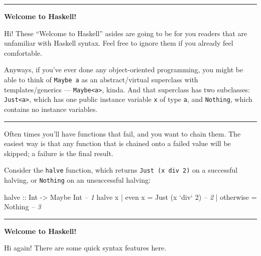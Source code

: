 \documentclass[]{article}
\newenvironment{Shaded}{}{}
\newcommand{\DataTypeTok}[1]{\textcolor[rgb]{0.56,0.13,0.00}{#1}}
\newcommand{\DecValTok}[1]{\textcolor[rgb]{0.25,0.63,0.44}{#1}}
\newcommand{\CommentTok}[1]{\textcolor[rgb]{0.38,0.63,0.69}{\textit{#1}}}
\newcommand{\OtherTok}[1]{\textcolor[rgb]{0.00,0.44,0.13}{#1}}
\newcommand{\FunctionTok}[1]{\textcolor[rgb]{0.02,0.16,0.49}{#1}}
\newcommand{\NormalTok}[1]{#1}
\begin{document}
\begin{center}\rule{0.5\linewidth}{\linethickness}\end{center}

\textbf{Welcome to Haskell!}

Hi! These ``Welcome to Haskell'' asides are going to be for you readers that are
unfamiliar with Haskell syntax. Feel free to ignore them if you already feel
comfortable.

Anyways, if you've ever done any object-oriented programming, you might be able
to think of \texttt{Maybe\ a} as an abstract/virtual superclass with
templates/generics --- \texttt{Maybe\textless{}a\textgreater{}}, kinda. And that
superclass has two subclasses: \texttt{Just\textless{}a\textgreater{}}, which
has one public instance variable \texttt{x} of type \texttt{a}, and
\texttt{Nothing}, which contains no instance variables.

\begin{center}\rule{0.5\linewidth}{\linethickness}\end{center}

Often times you'll have functions that fail, and you want to chain them. The
easiest way is that any function that is chained onto a failed value will be
skipped; a failure is the final result.

Consider the \texttt{halve} function, which returns
\texttt{Just\ (x\ \textasciigrave{}div\textasciigrave{}\ 2)} on a successful
halving, or \texttt{Nothing} on an unsuccessful halving:

\begin{Shaded}
\begin{Highlighting}[]
\OtherTok{halve ::} \DataTypeTok{Int} \OtherTok{->} \DataTypeTok{Maybe} \DataTypeTok{Int}                       \CommentTok{-- 1}
\NormalTok{halve x }\FunctionTok{|}\NormalTok{ even x    }\FunctionTok{=} \DataTypeTok{Just}\NormalTok{ (x }\OtherTok{`div`} \DecValTok{2}\NormalTok{)          }\CommentTok{-- 2}
        \FunctionTok{|}\NormalTok{ otherwise }\FunctionTok{=} \DataTypeTok{Nothing}                   \CommentTok{-- 3}
\end{Highlighting}
\end{Shaded}

\begin{center}\rule{0.5\linewidth}{\linethickness}\end{center}

\textbf{Welcome to Haskell!}

Hi again! There are some quick syntax features here.
\end{document}
